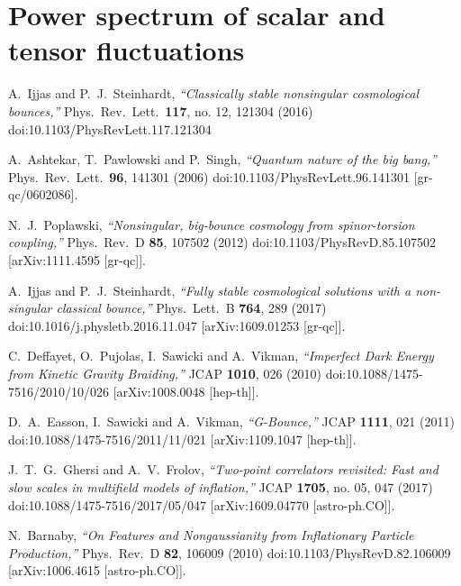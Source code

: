 \documentclass[aps,prd,reprint,twocolumn,showpacs,nofootinbib,superscriptaddress,floatfix]{revtex4-1}
\begin{document}
\section{Power spectrum of scalar and tensor fluctuations}\label{secIV}

\begin{thebibliography}{99}

  A.~Ijjas and P.~J.~Steinhardt,
  \textit{``Classically stable nonsingular cosmological bounces,''}
  Phys.\ Rev.\ Lett.\  {\bf 117}, no. 12, 121304 (2016)
  doi:10.1103/PhysRevLett.117.121304

  A.~Ashtekar, T.~Pawlowski and P.~Singh,
  \textit{``Quantum nature of the big bang,''}
  Phys.\ Rev.\ Lett.\  {\bf 96}, 141301 (2006)
  doi:10.1103/PhysRevLett.96.141301
  [gr-qc/0602086].
  
  N.~J.~Poplawski,
  \textit{``Nonsingular, big-bounce cosmology from spinor-torsion coupling,''}
  Phys.\ Rev.\ D {\bf 85}, 107502 (2012)
  doi:10.1103/PhysRevD.85.107502
  [arXiv:1111.4595 [gr-qc]].
  
  A.~Ijjas and P.~J.~Steinhardt,
  \textit{``Fully stable cosmological solutions with a non-singular classical bounce,''}
  Phys.\ Lett.\ B {\bf 764}, 289 (2017)
  doi:10.1016/j.physletb.2016.11.047
  [arXiv:1609.01253 [gr-qc]].
  
  C.~Deffayet, O.~Pujolas, I.~Sawicki and A.~Vikman,
  \textit{``Imperfect Dark Energy from Kinetic Gravity Braiding,''}
  JCAP {\bf 1010}, 026 (2010)
  doi:10.1088/1475-7516/2010/10/026
  [arXiv:1008.0048 [hep-th]].
  
  D.~A.~Easson, I.~Sawicki and A.~Vikman,
 \textit{``G-Bounce,''}
  JCAP {\bf 1111}, 021 (2011)
  doi:10.1088/1475-7516/2011/11/021
  [arXiv:1109.1047 [hep-th]].
  
  
  J.~T.~G.~Ghersi and A.~V.~Frolov,
  \textit{``Two-point correlators revisited: Fast and slow scales in multifield models of inflation,''}
  JCAP {\bf 1705}, no. 05, 047 (2017)
  doi:10.1088/1475-7516/2017/05/047
  [arXiv:1609.04770 [astro-ph.CO]].
  
  N.~Barnaby,
  \textit{``On Features and Nongaussianity from Inflationary Particle Production,''}
  Phys.\ Rev.\ D {\bf 82}, 106009 (2010)
  doi:10.1103/PhysRevD.82.106009
  [arXiv:1006.4615 [astro-ph.CO]].

\end{thebibliography}
\end{document}
